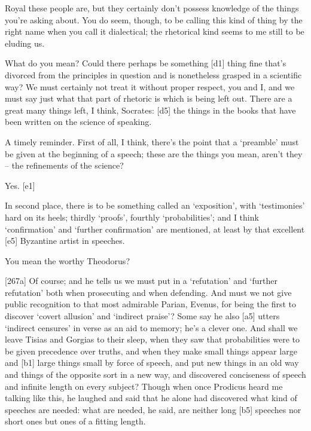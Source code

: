 Royal these people
are, but they certainly
don't possess knowledge of the things you're asking about. You do seem,
though, to be calling this kind of thing by the right name when you call
it dialectical; the rhetorical kind seems to me still to be eluding
us.

 What do you mean? Could there perhaps be something {[}d1{]}
thing fine that's divorced from the principles in question and is
nonetheless grasped in a scientific way? We must certainly not treat it
without proper respect, you and I, and we must say just what that part
of rhetoric is which is being left out.  There are a great many
things left, I think, Socrates: {[}d5{]} the things in the books that
have been written on the science of speaking.

 A timely reminder. First of all, I think, there's the point
that a ‘preamble' must be given at the beginning of a speech; these are
the things you mean, aren't they -- the refinements of the science?

 Yes. {[}e1{]}

 In second place, there is to be something called an
‘exposition', with ‘testimonies' hard on its heels; thirdly ‘proofs',
fourthly ‘probabilities'; and I think ‘confirmation' and ‘further
confirmation' are mentioned, at least by that excellent {[}e5{]}
Byzantine artist in speeches.

 You mean the worthy
Theodorus?

{[}267a{]}  Of course; and he tells us we must put in a
‘refutation' and ‘further refutation' both when prosecuting and when
defending. And must we not give public recognition to that most
admirable Parian, Evenus, for being the first to discover ‘covert
allusion' and ‘indirect praise'? Some say he also {[}a5{]} utters
‘indirect censures' in verse as an aid to memory; he's a clever one. And
shall we leave Tisias and Gorgias to their sleep, when they saw that
probabilities were to be given precedence over truths, and when they
make small things appear large and {[}b1{]} large things small by
force of speech, and put
new things in an old way and things of the opposite sort in a new way,
and discovered conciseness of speech and infinite length on every
subject? Though when once Prodicus heard me talking like this, he
laughed and said that he alone had discovered what kind of speeches are
needed: what are needed, he said, are neither long {[}b5{]} speeches nor
short ones but ones of a fitting length.


